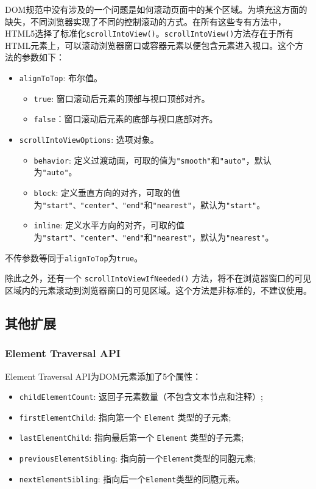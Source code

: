 DOM规范中没有涉及的一个问题是如何滚动页面中的某个区域。为填充这方面的缺失，不同浏览器实现了不同的控制滚动的方式。在所有这些专有方法中，HTML5选择了标准化\texttt{scrollIntoView()}。\texttt{scrollIntoView()}方法存在于所有HTML元素上，可以滚动浏览器窗口或容器元素以便包含元素进入视口。这个方法的参数如下：

\begin{itemize}
    \item \texttt{alignToTop}: 布尔值。
    \begin{itemize}
        \item \texttt{true}: 窗口滚动后元素的顶部与视口顶部对齐。
        \item \texttt{false}：窗口滚动后元素的底部与视口底部对齐。
    \end{itemize}
    \item \texttt{scrollIntoViewOptions}: 选项对象。
    \begin{itemize}
        \item \texttt{behavior}: 定义过渡动画，可取的值为\texttt{"smooth"}和\texttt{"auto"}，默认为\texttt{"auto"}。
        \item \texttt{block}: 定义垂直方向的对齐，可取的值为\texttt{"start"、"center"、"end"}和\texttt{"nearest"}，默认为\texttt{"start"}。
        \item \texttt{inline}: 定义水平方向的对齐，可取的值为\texttt{"start"、"center"、"end"}和\texttt{"nearest"}，默认为\texttt{"nearest"}。
    \end{itemize}
\end{itemize}

不传参数等同于\texttt{alignToTop}为\texttt{true}。

除此之外，还有一个 \texttt{scrollIntoViewIfNeeded()} 方法，将不在浏览器窗口的可见区域内的元素滚动到浏览器窗口的可见区域。这个方法是非标准的，不建议使用。

\subsection{其他扩展}

\subsubsection*{Element Traversal API}

Element Traversal API为DOM元素添加了5个属性：
\begin{itemize}
    \item \texttt{childElementCount}: 返回子元素数量（不包含文本节点和注释）;
    \item \texttt{firstElementChild}: 指向第一个 \texttt{Element} 类型的子元素;
    \item \texttt{lastElementChild}: 指向最后第一个 \texttt{Element} 类型的子元素;
    \item \texttt{previousElementSibling}: 指向前一个\texttt{Element}类型的同胞元素;
    \item \texttt{nextElementSibling}: 指向后一个\texttt{Element}类型的同胞元素。
\end{itemize}


